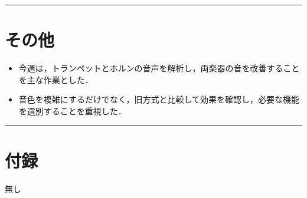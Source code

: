 \documentclass[uplatex,dvipdfmx,a4paper,11pt]{jsarticle}
\newcommand{\sectionrule}{\par\medskip\noindent\rule{\linewidth}{0.6pt}\par\medskip}
\begin{document}
\sectionrule

\section{その他}

\begin{itemize}
  \item 今週は，トランペットとホルンの音声を解析し，両楽器の音を改善することを主な作業とした．
  \item 音色を複雑にするだけでなく，旧方式と比較して効果を確認し，必要な機能を選別することを重視した．
\end{itemize}

\sectionrule

\section{付録}

無し
\end{document}
